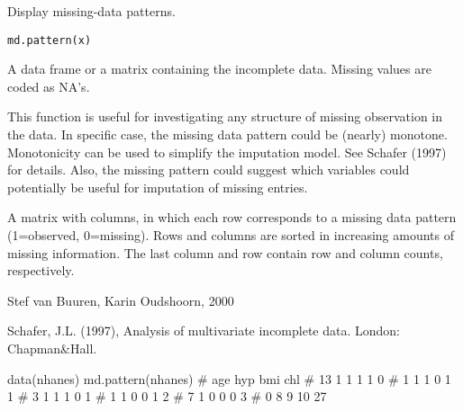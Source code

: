 \begin{Description}\relax
Display missing-data patterns.
\end{Description}
\begin{Usage}
\begin{verbatim}
md.pattern(x)
\end{verbatim}
\end{Usage}
\begin{Arguments}
\begin{ldescription}
\item[\code{x}] A data frame or a matrix containing the incomplete data. 
Missing values are coded as NA's. 
\end{ldescription}
\end{Arguments}
\begin{Details}\relax
This function is useful for investigating any structure of missing 
observation in the data. In specific case, the missing data pattern 
could be (nearly) monotone. Monotonicity can be used to simplify the 
imputation model. See Schafer (1997) for details. Also, the missing
pattern could suggest which variables could potentially be useful for
imputation of missing entries.
\end{Details}
\begin{Value}
A matrix with  columns, in which each row corresponds to
a missing data pattern (1=observed, 0=missing). 
Rows and columns are sorted in increasing amounts of missing 
information. The last column and row contain row and column counts,
respectively.
\end{Value}
\begin{Author}\relax
Stef van Buuren, Karin Oudshoorn, 2000
\end{Author}
\begin{References}\relax
Schafer, J.L. (1997), Analysis of multivariate incomplete data. 
London: Chapman\&Hall.
\end{References}
\begin{Examples}
\begin{ExampleCode}
data(nhanes)
md.pattern(nhanes)
#     age hyp bmi chl    
#  13   1   1   1   1  0
#   1   1   1   0   1  1
#   3   1   1   1   0  1
#   1   1   0   0   1  2
#   7   1   0   0   0  3
#   0   8   9  10 27

\end{ExampleCode}
\end{Examples}

